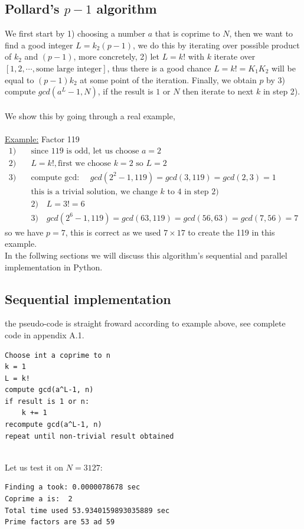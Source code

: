 \documentclass[10pt]{article}
\begin{document}
\subsection{Pollard's $p-1$ algorithm\cite{suzuki}}
We first start by 1) choosing a number $a$ that is coprime to $N$, then we want to find a good integer $L=k_2(p-1)$, we do this by iterating over possible product of $k_2$ and $(p-1)$, more concretely, 2) let $L= k!$ with $k$ iterate over $[1, 2, \cdots, \text{some large integer}]$, thus there is a good chance $L=k!=K_1K_2$ will be equal to $(p-1)k_2$ at some point of the iteration. Finally, we obtain $p$ by 3) compute $gcd(a^L-1, N)$, if the result is $1$ or $N$ then iterate to next $k$ in step 2).\\
\-\ \\
We show this by going through a real example,\\
\-\ \\
\underline{Example:} Factor 119\\
\begin{align*}
1)& \quad \text{since 119 is odd, let us choose $a=2$}\\
2)& \quad L=k!, \text{first we choose $k=2$ so $L=2$}\\
3)& \quad \text{compute gcd: }\quad gcd(2^2-1, 119) = gcd(3,119) = gcd(2,3) = 1\\
&\quad \text{this is a trivial solution, we change $k$ to $4$ in step 2)}\\
&\quad 2) \quad L = 3! = 6\\
&\quad 3) \quad gcd(2^6-1, 119)=gcd(63, 119)=gcd(56,63)=gcd(7,56)=7
\end{align*}
so we have $p=7$, this is correct as we used $7\times17$ to create the 119 in this example.\\
In the follwing sections we will discuss this algorithm's sequential and parallel implementation in Python. 
\subsection{Sequential implementation}
the pseudo-code is straight froward according to example above, see complete code in appendix A.1.
\begin{verbatim}
Choose int a coprime to n
k = 1
L = k!
compute gcd(a^L-1, n)
if result is 1 or n:
    k += 1
recompute gcd(a^L-1, n)
repeat until non-trivial result obtained
\end{verbatim}
\-\ \\
Let us test it on $N=3127$:
\begin{verbatim}
Finding a took: 0.0000078678 sec
Coprime a is:  2
Total time used 53.9340159893035889 sec
Prime factors are 53 ad 59
\end{verbatim}
\end{document}
